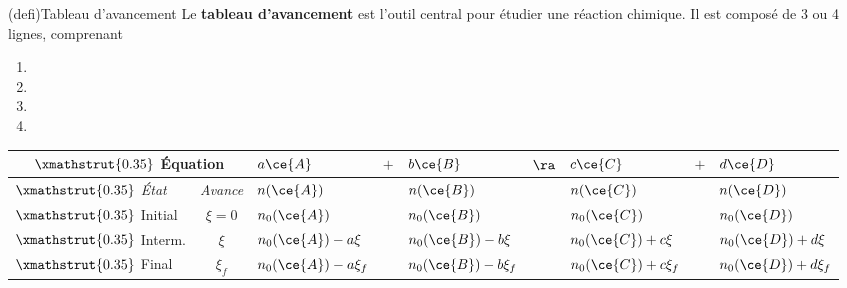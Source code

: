 \documentclass[../../main/main.tex]{subfiles}
\begin{document}
\begin{tcb}[label=def:tabav](defi){Tableau d'avancement}
	Le \textbf{tableau d'avancement} est l'outil central pour étudier une
	réaction chimique. Il est composé de 3 ou 4 lignes, comprenant
	\begin{enumerate}
		\item {}
		\item {}
		\item {}
		\item {}
	\end{enumerate}
	\begin{center}
		\def\rhgt{0.35}
		\centering
		\begin{tabularx}{\linewidth}{|l|c|YdYdYdY|}
			\hline
			\multicolumn{2}{|c|}{
				$\xmathstrut{\rhgt}$
			\textbf{Équation}}     &
			$a\ce{A}$              & $+$                 &
			$b\ce{B}$              & $\ra$               &
			$c\ce{C}$              & $+$                 &
			$d\ce{D}$                                      \\
			\hline
			$\xmathstrut{\rhgt}$
			\textit{État}          & \textit{Avance\mnt} &
			$n(\ce{A})$            & \vline              &
			$n(\ce{B})$            & \vline              &
			$n(\ce{C})$            & \vline              &
			$n(\ce{D})$                                    \\
			\hline
			$\xmathstrut{\rhgt}$
			Initial                & $\xi = 0$           &
			$n_0(\ce{A})$          & \vline              &
			$n_0(\ce{B})$          & \vline              &
			$n_0(\ce{C})$          & \vline              &
			$n_0(\ce{D})$                                  \\
			\hline
			$\xmathstrut{\rhgt}$
			Interm.                & $\xi$               &
			$n_0(\ce{A}) - a\xi$   & \vline              &
			$n_0(\ce{B}) - b\xi$   & \vline              &
			$n_0(\ce{C}) + c\xi$   & \vline              &
			$n_0(\ce{D}) + d\xi$                           \\
			\hline
			$\xmathstrut{\rhgt}$
			Final                  & $\xi_f$             &
			$n_0(\ce{A}) - a\xi_f$ & \vline              &
			$n_0(\ce{B}) - b\xi_f$ & \vline              &
			$n_0(\ce{C}) + c\xi_f$ & \vline              &
			$n_0(\ce{D}) + d\xi_f$                         \\
			\hline
		\end{tabularx}
	\end{center}
\end{tcb}
\end{document}

